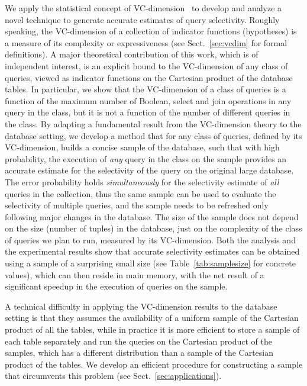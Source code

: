 We apply the statistical concept of VC-dimension~\citep{VapnikC71} to develop and
analyze a novel technique to generate accurate estimates of query
selectivity. Roughly speaking, the VC-dimension of a collection of indicator
functions (hypotheses) is a measure of its complexity or expressiveness (see
Sect.~\ref{sec:vcdim} for formal definitions). A major theoretical contribution
of this work, which is of independent interest, is an explicit bound to the
VC-dimension of any class of queries, viewed as indicator functions on the
Cartesian product of the database tables. In particular, we show that the
VC-dimension of a class of queries is a function of the maximum number of
Boolean, select and join operations in any query in the class, but it is not
a function of the number of different queries in the class. By adapting a
fundamental result from the VC-dimension theory to the database setting, we
develop a method that for any class of queries, defined by its VC-dimension,
builds a concise sample of the database, such that with high probability, the
execution of \emph{any} query in the class on the sample provides an accurate
estimate for the selectivity of the query on the original large database. The
error probability holds \emph{simultaneously} for the selectivity estimate of
\emph{all} queries in the collection, thus the same sample can be used to
evaluate the selectivity of multiple queries, and the sample needs to be
refreshed only following major changes in the database. The size of the sample
does not depend on the size (number of tuples) in the database, just on the
complexity of the class of queries we plan to run, measured by its VC-dimension.
Both the analysis and the experimental results show that accurate selectivity
estimates can be obtained using a sample of a surprising small size (see
Table~\ref{tab:samplesize} for concrete values), which can then reside in main
memory, with the net result of a significant speedup in the execution of
queries on the sample. 

A technical difficulty in applying the VC-dimension results to the database
setting is that they assumes the availability of a uniform sample of the
Cartesian product of all the tables, while in practice it is more efficient to
store a sample of each table separately and run the queries on the Cartesian
product of the samples, which has a different distribution than a sample of the
Cartesian product of the tables. We develop an efficient  procedure for
constructing a sample that circumvents this problem (see
Sect.~\ref{sec:applications}).

